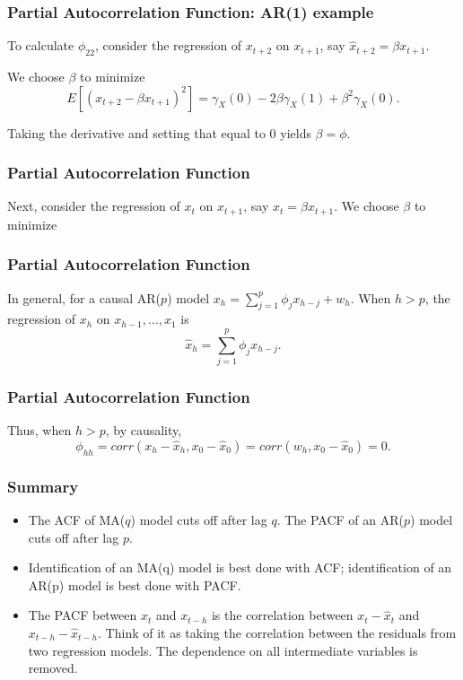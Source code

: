 \documentclass[%
xcolor=pdftex]{beamer}
\begin{document}
\begin{frame}
\frametitle{Partial Autocorrelation Function: AR(1) example}

To calculate $\phi_{22}$, consider the regression of $x_{t+2}$ on $x_{t+1}$, say $\hat{x}_{t+2}=\beta x_{t+1}$.
\newline

We choose $\beta$ to minimize 
$$
E\left[ \left( x_{t+2} - \beta x_{t+1}\right)^2 \right] = \gamma_X(0) - 2\beta \gamma_X(1) + \beta^2 \gamma_X(0).
$$

Taking the derivative and setting that equal to $0$ yields $\beta = \phi$.

\end{frame}



\begin{frame}
\frametitle{Partial Autocorrelation Function}

Next, consider the regression of $x_t$ on $x_{t+1}$, say
$\hat{x}_t=\beta x_{t+1}$. We choose $\beta$ to minimize

\vspace{50mm}

\end{frame}

\begin{frame}
\frametitle{Partial Autocorrelation Function}

In general, for a causal AR($p$) model $x_h=\sum^p_{j=1}\phi_j
x_{h-j}+w_h$. When $h>p$, the regression of $x_h$ on
$x_{h-1},\ldots,x_1$ is
$$
\hat{x}_{h} = \sum^p_{j=1} \phi_j x_{h-j}.
$$

\end{frame}

\begin{frame}
\frametitle{Partial Autocorrelation Function}

Thus, when $h>p$, by causality,
$$
\phi_{hh} = corr(x_h-\hat{x}_{h},x_0-\hat{x}_{0}) = corr(w_h,x_0-\hat{x}_{0}) = 0.
$$

\end{frame}

\begin{frame}
\frametitle{Summary}

\begin{itemize}
\item The ACF of MA($q$) model cuts off after lag $q$. The PACF of an AR($p$) model cuts off after lag $p$.
\item Identification of an MA(q) model is best done with ACF; identification of an AR(p) model is best done with PACF.
\item The PACF between $x_t$ and $x_{t-h}$ is the correlation between $x_t - \hat{x}_t$ and $x_{t-h} - \hat{x}_{t-h}$. Think of it as taking the correlation between the residuals from two regression models. The dependence on all intermediate variables is removed. 
\end{itemize}

\end{frame}
\end{document}
